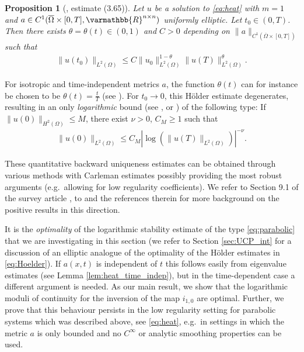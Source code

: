 \documentclass[12pt,twoside]{amsart}
\numberwithin{equation}{section}
\renewcommand{\leq}{\leqslant}
\renewcommand{\geq}{\geqslant}
\renewcommand{\mathbb}{\varmathbb}
\newtheorem{proposition}[theorem]{Proposition}
\newcommand {\R} {\mathbb{R}} \newcommand {\Z} {\mathbb{Z}}
\begin{document}
\begin{proposition}[\cite{Vessella}, estimate (3.65)]
\label{prop:parabolic_pos}
Let $u$ be a solution to \eqref{eq:heat} with $m=1$ and $a \in C^1(\overline{\Omega}\times [0,T], \R^{n\times n})$ uniformly elliptic. Let $t_0 \in (0,T)$. Then there exists $\theta = \theta(t) \in (0,1)$ and $C>0$ depending on $\|a\|_{C^1(\overline{\Omega}\times [0,T])}$ such that
\begin{align}
\label{eq:Hoelder}
\|u( t_0)\|_{L^2(\Omega)} \leq C \|u_0\|_{L^2(\Omega)}^{1-\theta} \|u( T)\|_{L^2(\Omega)}^{\theta}.
\end{align}
\end{proposition}

For isotropic and time-independent metrics $a$, the function $\theta(t)$ can for instance be chosen to be $\theta(t) = \frac{t}{T}$ (see \cite[(3.1.9)]{Isakov}). For $t_0 \rightarrow 0$, this H{\"o}lder estimate degenerates, resulting in an only \emph{logarithmic} bound (see \cite[equation (9.2)]{Yamamoto}, \cite[Chapter 3]{Isakov} or \cite{Klibanov_parabolic}) of the following type: If $\|u(0)\|_{H^2(\Omega)}\leq M$, there exist $\nu>0$, $C_M\geq 1$ such that
\begin{align}
\label{eq:parabolic}
\|u(0)\|_{L^2(\Omega)} \leq C_M |\log(\|u(T)\|_{L^2(\Omega)})|^{-\nu}.
\end{align}


 These quantitative backward uniqueness estimates can be obtained through various methods with Carleman estimates possibly providing the most robust arguments (e.g.\ allowing for low regularity coefficients). We refer to Section 9.1 of the survey article \cite{Yamamoto}, to \cite[Theorems 3, 4]{Klibanov_parabolic} and the references therein for more background on the positive results in this direction.

It is the \emph{optimality} of the logarithmic stability estimate of the type \eqref{eq:parabolic} that we are investigating in this section (we refer to Section \ref{sec:UCP_int} for a discussion of an elliptic analogue of the optimality of the H{\"o}lder estimates in \eqref{eq:Hoelder}). If $a(x,t)$ is independent of $t$ this follows easily from eigenvalue estimates (see Lemma \ref{lem:heat_time_indep}), but in the time-dependent case a different argument is needed. 
As our main result, we show that the logarithmic moduli of continuity for the inversion of the map $i_{1,0}$ are optimal. Further, we prove that this behaviour persists in the low regularity setting for parabolic systems which was described above, see \eqref{eq:heat}, e.g.\ in settings in which the metric $a$ is only bounded and no $C^{\infty}$ or analytic smoothing properties can be used.  
\end{document}
